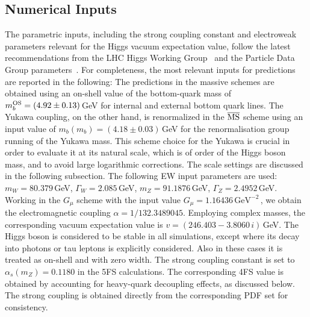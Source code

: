 \documentclass[11pt,a4paper]{article}
\begin{document}
\subsection{Numerical Inputs}
The parametric inputs, including the strong coupling constant and electroweak parameters relevant for the Higgs vacuum expectation value, follow the latest recommendations from the LHC Higgs Working Group~\cite{Karlberg:2024zxx} and the Particle Data Group parameters~\cite{ParticleDataGroup:2024cfk}. For completeness, the most relevant inputs for \bbH{} predictions are reported in the following: The predictions in the massive schemes are obtained using
an on-shell value of the bottom-quark mass of $m_b^{\rm OS}=(4.92\pm0.13)$\,GeV for internal and external bottom quark lines.
The Yukawa coupling, on the other hand, is renormalized in the $\overline{\text{MS}}{}$ scheme using an input value of $m_b(m_b)=(4.18\pm0.03)$\,GeV
for the renormalisation group running of the Yukawa mass. This scheme choice for the Yukawa is crucial in order to evaluate it at its natural
scale, which is of order of the Higgs boson mass, and to avoid large logarithmic corrections. The scale settings are discussed in the following subsection.
The following EW input parameters are used: $m_W = 80.379$\,GeV, $\Gamma_W=2.085$\,GeV, $m_Z = 91.1876$\,GeV, $\Gamma_Z=2.4952$\,GeV. Working in the $G_\mu$ scheme with the input value $G_\mu=1.16436\,\text{GeV}^{-2}$\,, we obtain the electromagnetic coupling $\alpha=1/132.3489045$. Employing complex masses, the corresponding vacuum expectation value is $v=(246.403-3.8060\,i)$\,GeV.
The Higgs boson is considered to be stable in all simulations,
except where its decay into photons or tau leptons is explicitly considered. 
Also in these cases it is treated as on-shell and with zero width.
The strong coupling constant is set to $\alpha_s(m_Z) = 0.1180$ 
in the 5FS calculations. The corresponding 4FS value is obtained 
by accounting for heavy-quark decoupling effects, as discussed below.
The strong coupling is obtained directly from the corresponding PDF set
for consistency.
\end{document}
